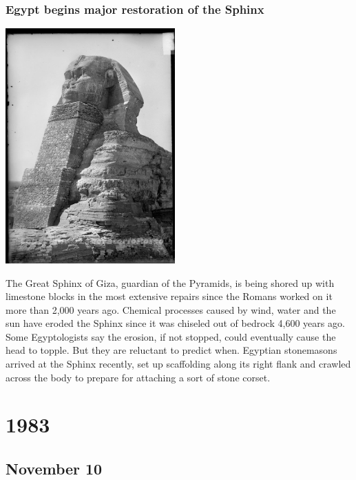 \documentclass[11pt]{report}
\begin{document}
\subsection{Egypt begins major restoration of the Sphinx}
\vspace{2mm}\begin{center}\includegraphics[width=6.5cm]{./img/sphinxRestoration.jpg}\end{center}
The Great Sphinx of Giza, guardian of the Pyramids, is being shored up with limestone blocks in the most extensive repairs since the Romans worked on it more than 2,000 years ago.
Chemical processes caused by wind, water and the sun have eroded the Sphinx since it was chiseled out of bedrock 4,600 years ago. Some Egyptologists say the erosion, if not stopped, could eventually cause the head to topple. But they are reluctant to predict when.
Egyptian stonemasons arrived at the Sphinx recently, set up scaffolding along its right flank and crawled across the body to prepare for attaching a sort of stone corset.

\chapter{1983}
\section{November 10}
\end{document}

